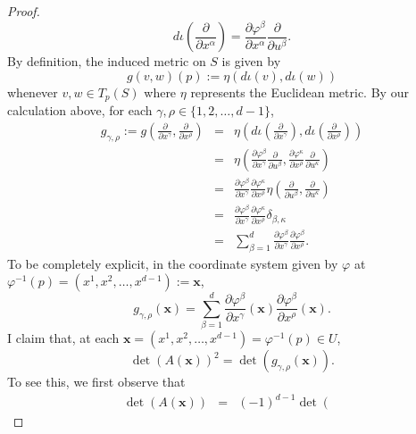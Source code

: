 \documentclass{article}
\theoremstyle{definition}
\renewcommand\det{\operatorname{det}}
\theoremstyle{theorem}
\begin{document}
\begin{proof}
\begin{equation*}
d\iota\left(\frac{\partial}{\partial x^{\alpha}}\right)=\frac{\partial \varphi^{\beta}}{\partial x^{\alpha}}\frac{\partial}{\partial u^{\beta}}.
\end{equation*}
By definition, the induced metric on $S$ is given by
\begin{equation*}
g(v,w)(p):=\eta(d\iota(v),d\iota(w))
\end{equation*}
whenever $v,w\in T_p(S)$ where $\eta$ represents the Euclidean metric. By our calculation above, for each $\gamma,\rho\in \{1,2,\dots,d-1\}$,
\begin{eqnarray*}
g_{\gamma,\rho}:=g\left(\frac{\partial}{\partial x^\gamma},\frac{\partial}{\partial x^\rho}\right)&=&\eta\left(d\iota\left(\frac{\partial}{\partial x^{\gamma}}\right),d\iota\left(\frac{\partial}{\partial x^{\rho}}\right)\right)\\
&=&\eta\left(\frac{\partial \varphi^{\beta}}{\partial x^{\gamma}}\frac{\partial}{\partial u^{\beta}},\frac{\partial \varphi^{\kappa}}{\partial x^{\rho}}\frac{\partial}{\partial u^{\kappa}}\right)\\
&=&\frac{\partial\varphi^{\beta}}{\partial x^{\gamma}}\frac{\partial\varphi^{\kappa}}{\partial x^{\rho}}\eta\left(\frac{\partial}{\partial u^{\beta}},\frac{\partial}{\partial u^{\kappa}}\right)\\
&=&\frac{\partial\varphi^{\beta}}{\partial x^{\gamma}}\frac{\partial\varphi^{\kappa}}{\partial x^{\rho}}\delta_{\beta,\kappa}\\
&=&\sum_{\beta=1}^{d}\frac{\partial\varphi^{\beta}}{\partial x^{\gamma}}\frac{\partial\varphi^{\beta}}{\partial x^{\rho}}.
\end{eqnarray*}
To be completely explicit, in the coordinate system given by $\varphi$ at $\varphi^{-1}(p)=(x^1,x^2,\dots,x^{d-1}):=\mathbf{x}$,
\begin{equation*}
g_{\gamma,\rho}(\mathbf{x})=\sum_{\beta=1}^d \frac{\partial\varphi^{\beta}}{\partial x^{\gamma}}(\mathbf{x})\frac{\partial\varphi^{\beta}}{\partial x^{\rho}}(\mathbf{x}).
\end{equation*}
I claim that, at each $\mathbf{x}=(x^1,x^2,\dots,x^{d-1})=\varphi^{-1}(p)\in U$,
\begin{equation*}
\det(A(\mathbf{x}))^2=\det(g_{\gamma,\rho}(\mathbf{x})).
\end{equation*}
To see this, we first observe that
\begin{eqnarray*}
\det(A(\mathbf{x}))&=&(-1)^{d-1}\det\left(\begin{array}{c|ccccc}

\end{array}
\end{eqnarray*}
\end{proof}
\end{document}
